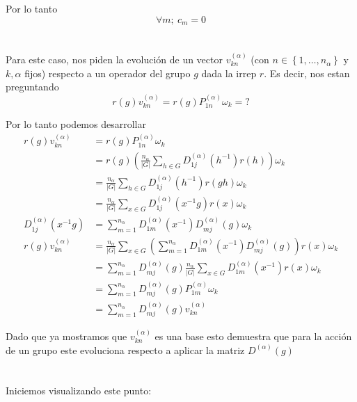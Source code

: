 \documentclass[12pt]{amsart}
\begin{document}
  Por lo tanto $$\forall m;\ c_m = 0$$

  \section{}

  Para este caso, nos piden la evolución de un vector $v_{kn}^{(\alpha)}$ (con $n \in \left\{1, \ldots, n_\alpha\right\}$ y $k, \alpha$ fijos) respecto a un operador del grupo $g$ dada la irrep $r$. Es decir, nos estan preguntando 
  $$r(g)v_{kn}^{(\alpha)} = r(g) P_{1n}^{(\alpha)} \omega_k = ?$$

  Por lo tanto podemos desarrollar
  \begin{align*}
    r(g)v_{kn}^{(\alpha)} &= r(g) P_{1n}^{(\alpha)} \omega_k\\
    &= r(g) \left(\frac{n_\alpha}{\left|G\right|} \sum_{h \in G} D_{1j}^{(\alpha)} (h^{-1}) r(h)\right)\omega_k\\
    &= \frac{n_\alpha}{\left|G\right|} \sum_{h \in G} D_{1j}^{(\alpha)} (h^{-1}) r(gh)\omega_k\\
    &= \frac{n_\alpha}{\left|G\right|} \sum_{x \in G} D_{1j}^{(\alpha)} (x^{-1}g) r(x)\omega_k\\
    D_{1j}^{(\alpha)}(x^{-1} g) &= \sum_{m = 1}^{n_\alpha} D_{1m}^{(\alpha)}(x^{-1}) D_{mj}^{(\alpha)} (g)\omega_k\\
    r(g)v_{kn}^{(\alpha)} &= \frac{n_\alpha}{\left|G\right|} \sum_{x \in G} \left(\sum_{m = 1}^{n_\alpha} D_{1m}^{(\alpha)}(x^{-1}) D_{mj}^{(\alpha)} (g) \right) r(x)\omega_k\\
    &= \sum_{m = 1}^{n_\alpha} D_{mj}^{(\alpha)} (g) \frac{n_\alpha}{\left|G\right|} \sum_{x \in G}  D_{1m}^{(\alpha)}(x^{-1})  r(x)\omega_k\\
    &= \sum_{m = 1}^{n_\alpha} D_{mj}^{(\alpha)} (g) P_{1m}^{(\alpha)}\omega_k\\
    &= \sum_{m = 1}^{n_\alpha} D_{mj}^{(\alpha)} (g) v_{kn}^{(\alpha)}
  \end{align*}

  Dado que ya mostramos que $v_{kn}^{(\alpha)}$ es una base esto demuestra que para la acción de un grupo este evoluciona respecto a aplicar la matriz $D^{(\alpha)}(g)$

  \section{}

  Iniciemos visualizando este punto:
\end{document}
